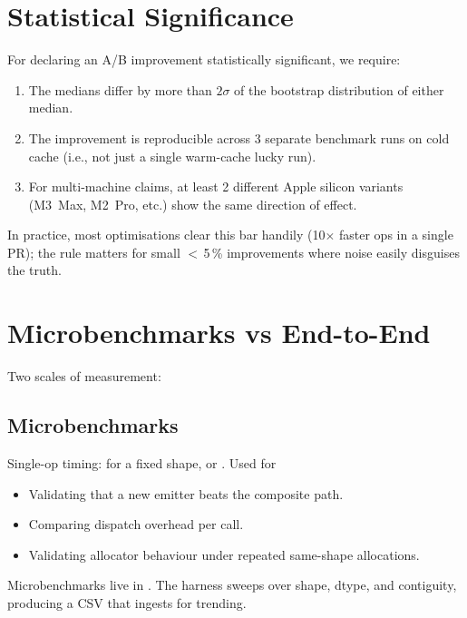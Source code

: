 \section{Statistical Significance}
\label{sec:perf_methodology:statistical}

For declaring an A/B improvement statistically significant, we
require:

\begin{enumerate}
  \item The medians differ by more than $2\sigma$ of the
    bootstrap distribution of either median.
  \item The improvement is reproducible across 3 separate
    benchmark runs on cold cache (i.e., not just a single
    warm-cache lucky run).
  \item For multi-machine claims, at least 2 different Apple
    silicon variants (M3~Max, M2~Pro, etc.) show the same
    direction of effect.
\end{enumerate}

In practice, most optimisations clear this bar handily (10$\times$
faster ops in a single PR); the rule matters for small
$<$\,5\,\% improvements where noise easily disguises the truth.

\section{Microbenchmarks vs End-to-End}
\label{sec:perf_methodology:micro_vs_e2e}

Two scales of measurement:

\subsection{Microbenchmarks}
\label{ssec:perf_methodology:micro}

Single-op timing:  for a fixed shape,
or . Used for
\begin{itemize}
  \item Validating that a new emitter beats the composite path.
  \item Comparing dispatch overhead per call.
  \item Validating allocator behaviour under repeated
    same-shape allocations.
\end{itemize}

Microbenchmarks live in . The harness
sweeps over shape, dtype, and contiguity, producing a CSV that
 ingests for trending.

